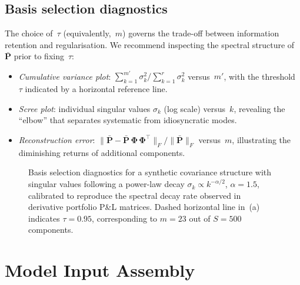 \documentclass[11pt,a4paper]{article}
\newcommand{\bP}{\bm{P}}
\newcommand{\bPhi}{\bm{\Phi}}
\begin{document}
\subsection{Basis selection diagnostics}\label{sec:dimred:diagnostics}

The choice of~$\tau$ (equivalently,~$m$) governs the trade-off between
information retention and regularisation.  We recommend inspecting the spectral
structure of $\bar{\bP}$ prior to fixing~$\tau$:
%
\begin{itemize}[nosep]
  \item \emph{Cumulative variance plot}:
    $\sum_{k=1}^{m'}\sigma_k^2 \big/ \sum_{k=1}^{r}\sigma_k^2$ versus~$m'$,
    with the threshold $\tau$ indicated by a horizontal reference line.
  \item \emph{Scree plot}:
    individual singular values $\sigma_k$ (log scale) versus~$k$, revealing
    the ``elbow'' that separates systematic from idiosyncratic modes.
  \item \emph{Reconstruction error}:
    $\lVert \bar{\bP} - \bar{\bP}\,\bPhi\,\bPhi^\top \rVert_F
    \big/ \lVert \bar{\bP} \rVert_F$
    versus~$m$, illustrating the diminishing returns of additional components.
\end{itemize}

\begin{figure}[t]
  \centering
  \caption{%
    Basis selection diagnostics for a synthetic covariance structure with
    singular values following a power-law decay
    $\sigma_k \propto k^{-\alpha/2}$, $\alpha = 1.5$, calibrated to
    reproduce the spectral decay rate observed in derivative portfolio
    P\&L matrices.  Dashed horizontal line in~(a) indicates
    $\tau = 0.95$, corresponding to $m = 23$ out of $S = 500$
    components.%
  }
  \label{fig:basis-diagnostics}
\end{figure}


\section{Model Input Assembly}\label{sec:assembly}
\end{document}
